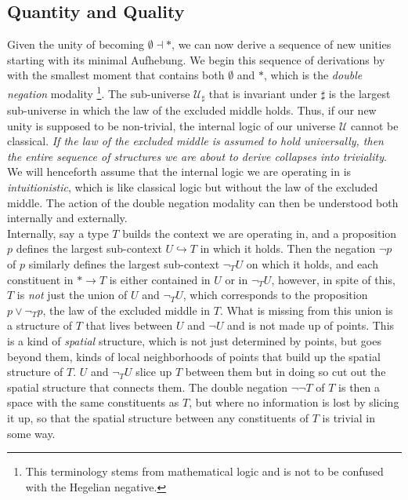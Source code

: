 \documentclass{article}
\begin{document}
\subsection{Quantity and Quality}
Given the unity of becoming $\emptyset\dashv *$, we can now derive a sequence of new unities starting with its minimal Aufhebung. We begin this sequence of derivations by with the smallest moment that contains both $\emptyset$ and $*$, which is the \emph{double negation} modality\cite{Sketches} \footnote{This terminology stems from mathematical logic and is not to be confused with the Hegelian negative.}. The sub-universe $\mathcal{U}_\sharp$ that is invariant under $\sharp$ is the largest sub-universe in which the law of the excluded middle holds. Thus, if our new unity is supposed to be non-trivial, the internal logic of our universe $\mathcal{U}$ cannot be classical. \emph{If the law of the excluded middle is assumed to hold universally, then the entire sequence of structures we are about to derive collapses into triviality}. We will henceforth assume that the internal logic we are operating in is \emph{intuitionistic}, which is like classical logic but without the law of the excluded middle. The action of the double negation modality can then be understood both internally and externally. \\

Internally, say a type $T$ builds the context we are operating in, and a proposition $p$ defines the largest sub-context $U\hookrightarrow T$ in which it holds. Then the negation $\neg p$ of $p$ similarly defines the largest sub-context $\neg_T U$ on which it holds, and each constituent in $*\rightarrow T$ is either contained in $U$ or in $\neg_T U$, however, in spite of this, $T$ is \emph{not} just the union of $U$ and $\neg_T U$, which corresponds to the proposition $p\vee \neg_T p$, the law of the excluded middle in $T$. What is missing from this union is a structure of $T$ that lives between $U$ and $\neg U$ and is not made up of points. This is a kind of \emph{spatial} structure, which is not just determined by points, but goes beyond them, kinds of local neighborhoods of points that build up the spatial structure of $T$. $U$ and $\neg_T U$ slice up $T$ between them but in doing so cut out the spatial structure that connects them. The double negation $\neg\neg T$ of $T$ is then a space with the same constituents as $T$, but where no information is lost by slicing it up, so that the spatial structure between any constituents of $T$ is trivial in some way. \\
\end{document}
